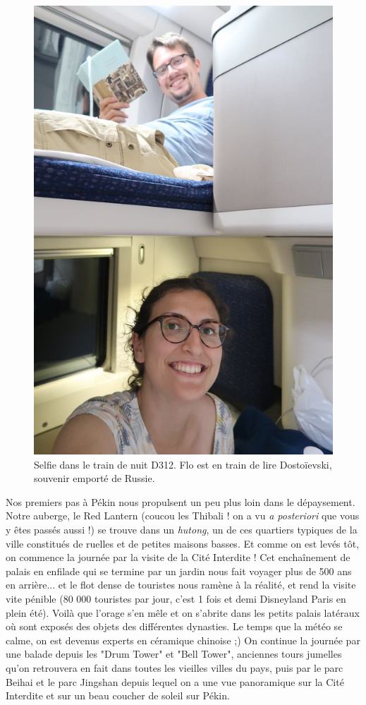 \begin{figure}
\centering
\includegraphics{images/20180616_trainnuit.JPG}
\caption{Selfie dans le train de nuit D312. Flo est en train de lire
Dostoïevski, souvenir emporté de Russie.}
\end{figure}

Nos premiers pas à Pékin nous propulsent un peu plus loin dans le
dépaysement. Notre auberge, le Red Lantern (coucou les Thibali ! on a vu
\emph{a posteriori} que vous y êtes passés aussi !) se trouve dans un
\emph{hutong}, un de ces quartiers typiques de la ville constitués de
ruelles et de petites maisons basses. Et comme on est levés tôt, on
commence la journée par la visite de la Cité Interdite ! Cet
enchaînement de palais en enfilade qui se termine par un jardin nous
fait voyager plus de 500 ans en arrière... et le flot dense de touristes
nous ramène à la réalité, et rend la visite vite pénible (80 000
touristes par jour, c'est 1 fois et demi Disneyland Paris en plein été).
Voilà que l'orage s'en mêle et on s'abrite dans les petits palais
latéraux où sont exposés des objets des différentes dynasties. Le temps
que la météo se calme, on est devenus experts en céramique chinoise ;)
On continue la journée par une balade depuis les "Drum Tower" et "Bell
Tower", anciennes tours jumelles qu'on retrouvera en fait dans toutes
les vieilles villes du pays, puis par le parc Beihai et le parc Jingshan
depuis lequel on a une vue panoramique sur la Cité Interdite et sur un
beau coucher de soleil sur Pékin.

